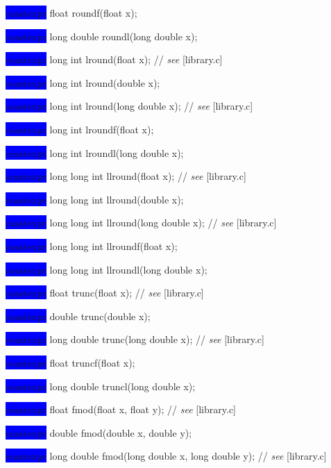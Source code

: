 \documentclass[prd,twocolumn,amsmath,amssymb,nofootinbib,eqsecnum]{revtex4-1}
\newcommand{\oldhighlight}[1]{\colorbox{blue}{\!\!\!\! #1}}
\newcommand{\stdcomment}[1]{{// {\it see} [#1]}}
\begin{document}
{\oldhighlight{constexpr} float roundf(float x);

\oldhighlight{constexpr} long double roundl(long double x);

\vspace{2ex}


\oldhighlight{constexpr} long int lround(float x); \stdcomment{library.c}

\oldhighlight{constexpr} long int lround(double x);

\oldhighlight{constexpr} long int lround(long double x); \stdcomment{library.c}

\oldhighlight{constexpr} long int lroundf(float x);

\oldhighlight{constexpr} long int lroundl(long double x);

\vspace{2ex}


\oldhighlight{constexpr} long long int llround(float x); \stdcomment{library.c}

\oldhighlight{constexpr} long long int llround(double x);

\oldhighlight{constexpr} long long int llround(long double x); \stdcomment{library.c}

\oldhighlight{constexpr} long long int llroundf(float x);

\oldhighlight{constexpr} long long int llroundl(long double x);

\vspace{2ex}


\oldhighlight{constexpr} float trunc(float x); \stdcomment{library.c}

\oldhighlight{constexpr} double trunc(double x);

\oldhighlight{constexpr} long double trunc(long double x); \stdcomment{library.c}

\oldhighlight{constexpr} float truncf(float x);

\oldhighlight{constexpr} long double truncl(long double x);

\vspace{2ex}


\oldhighlight{constexpr} float fmod(float x, float y); \stdcomment{library.c}

\oldhighlight{constexpr} double fmod(double x, double y);

\oldhighlight{constexpr} long double fmod(long double x, long double y); \stdcomment{library.c}

}
\end{document}
